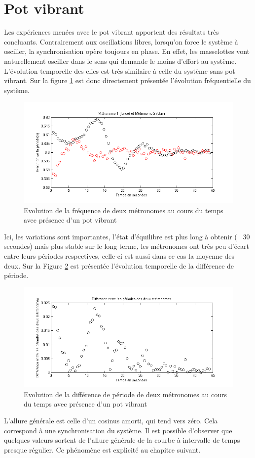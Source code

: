 \documentclass[a4paper,11pt]{report}
\begin{document}
\section{Pot vibrant}
Les expériences menées avec le pot vibrant apportent des résultats très concluants. Contrairement aux oscillations libres, lorsqu'on force le système à osciller, la synchronisation opère toujours en phase. En effet, les masselottes vont naturellement osciller dans le sens qui demande le moins d'effort au système. L'évolution temporelle des clics est très similaire à celle du système sans pot vibrant. Sur la figure \ref{SynchroFP} est donc directement présentée l'évolution fréquentielle du système.
\begin{figure}[h]
\centering
\includegraphics[width=1\textwidth]{PotVibrant_Synchro_Frequence_200BPM}
\caption{Evolution de la fréquence de deux métronomes au cours du temps avec présence d'un pot vibrant}
\label{SynchroFP}
\end{figure}
Ici, les variations sont importantes, l'état d'équilibre est plus long à obtenir (~ 30 secondes) mais plus stable sur le long terme, les métronomes ont très peu d'écart entre leurs périodes respectives, celle-ci est aussi dans ce cas la moyenne des deux. Sur la Figure \ref{SynchroPP} est présentée l'évolution temporelle de la différence de période.
\begin{figure}[h]
\centering
\includegraphics[width=1\textwidth]{PotVibrant_Synchro_Periode_200BPM}
\caption{Evolution de la différence de période de deux métronomes au cours du temps avec présence d'un pot vibrant}
\label{SynchroPP}
\end{figure}
L'allure générale est celle d'un cosinus amorti, qui tend vers zéro. Cela correspond à une synchronisation du système. Il est possible d'observer que quelques valeurs sortent de l'allure générale de la courbe à intervalle de temps presque régulier. Ce phénomène est explicité au chapitre suivant.
\end{document}

